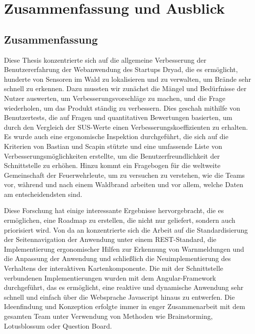 \chapter{Zusammenfassung und Ausblick}

\section{Zusammenfassung}

Diese Thesis konzentrierte sich auf die allgemeine Verbesserung der Benutzererfahrung der Webanwendung des Startups Dryad, die es ermöglicht, hunderte von Sensoren im Wald zu lokalisieren und zu verwalten, um Brände sehr schnell zu erkennen.
Dazu mussten wir zunächst die Mängel und Bedürfnisse der Nutzer auswerten, um Verbesserungsvorschläge zu machen, und die Frage wiederholen, um das Produkt ständig zu verbessern.
Dies geschah mithilfe von Benutzertests, die auf Fragen und quantitativen Bewertungen basierten, um durch den Vergleich der \ac{SUS}-Werte einen Verbesserungskoeffizienten zu erhalten.
Es wurde auch eine ergonomische Inspektion durchgeführt, die sich auf die Kriterien von Bastian und Scapin stützte und eine umfassende Liste von Verbesserungsmöglichkeiten erstellte, um die Benutzerfreundlichkeit der Schnittstelle zu erhöhen.
Hinzu kommt ein Fragebogen für die weltweite Gemeinschaft der Feuerwehrleute, um zu versuchen zu verstehen, wie die Teams vor, während und nach einem Waldbrand arbeiten und vor allem, welche Daten am entscheidendsten sind.

Diese Forschung hat einige interessante Ergebnisse hervorgebracht, die es ermöglichen, eine Roadmap zu erstellen, die nicht nur geliefert, sondern auch priorisiert wird.
Von da an konzentrierte sich die Arbeit auf die Standardisierung der Seitennavigation der Anwendung unter einem REST-Standard, die Implementierung ergonomischer Hilfen zur Erkennung von Warnmeldungen und die Anpassung der Anwendung und schließlich die Neuimplementierung des Verhaltens der interaktiven Kartenkomponente.
Die mit der Schnittstelle verbundenen Implementierungen wurden mit dem Angular-Framework durchgeführt, das es ermöglicht, eine reaktive und dynamische Anwendung sehr schnell und einfach über die Websprache Javascript hinaus zu entwerfen.
Die Ideenfindung und Konzeption erfolgte immer in enger Zusammenarbeit mit dem gesamten Team unter Verwendung von Methoden wie Brainstorming, Lotusblossum oder Question Board.

